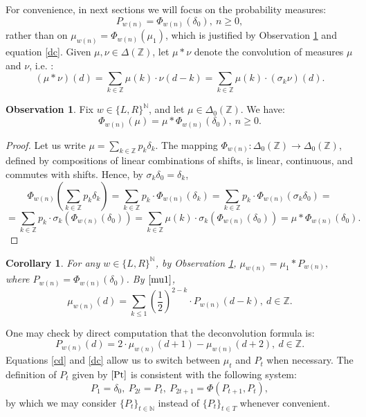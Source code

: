 \documentclass[10pt]{amsart}
\newtheorem{corollary}[theorem]{Corollary}
\theoremstyle{definition}
\newtheorem{observation}[theorem]{Observation}
\numberwithin{equation}{section}
\newcommand{\dd}{\delta}
\newcommand{\N}{\mathbb{N}}
\newcommand{\Z}{\mathbb{Z}}
\begin{document}
For convenience, in next sections we will focus on the probability measures:
\begin{equation}\label{Pt}
P_{w(n)} = \Phi_{w(n)}(\delta_0),\ n\geq 0, 
\end{equation} 
rather than on $\mu_{w(n)}= \Phi_{w(n)}(\mu_1)$, which is justified by Observation \ref{O2} and equation \eqref{dc}. %
 Given $\mu,\nu\in\Delta(\Z)$, let $\mu\ast\nu$ denote the convolution of measures $\mu$ and $\nu$, i.e. :
$$(\mu\ast\nu)(d)=\sum\limits_{k\in\Z}\mu(k)\cdot\nu(d-k)=\sum\limits_{k\in\Z}\mu(k)\cdot (\sigma_{k}\nu)(d).$$
\begin{observation}\label{O2}
Fix $w\in\{L,R\}^\N$, and let $\mu\in \Delta_0(\Z)$. We have:
  \begin{equation}\Phi_{w(n)}(\mu)=\mu\ast \Phi_{w(n)}(\delta_0),\ n\geq0.
\end{equation}
\end{observation}
\begin{proof}
 Let us write $\mu=\sum\limits_{k\in\Z}p_k\delta_k$. The mapping $\Phi_{w(n)}\colon\Delta_0(\Z)\to\Delta_0(\Z)$, defined by compositions of linear combinations of shifts,  is linear, continuous, and commutes with shifts. Hence, by $\sigma_{k}\dd_0=\dd_k$,
$$\Phi_{w(n)}\left(\sum\limits_{k\in\Z}p_k\delta_k\right)=\sum\limits_{k\in\Z}p_k\cdot\Phi_{w(n)}(\delta_k)=\sum\limits_{k\in\Z}p_k\cdot\Phi_{w(n)}(\sigma_{k}\dd_0)=$$
$$=\sum\limits_{k\in\Z}p_k\cdot \sigma_{k}(\Phi_{w(n)}(\dd_0))=\sum\limits_{k\in\Z}\mu(k)\cdot \sigma_{k}(\Phi_{w(n)}(\dd_0))=\mu\ast\Phi_{w(n)}(\dd_0).$$
\end{proof}




\begin{corollary}\label{RR}
For any $w\in\{L,R\}^\N$,  by Observation \ref{O2}, $\mu_{w(n)}=\mu_1\ast P_{w(n)},$
where $P_{w(n)}=\Phi_{w(n)}(\dd_0)$. By $\eqref{mu1}$,
\begin{equation}\label{cd}
\mu_{w(n)}(d)=\sum\limits_{k\leq 1} \left(\frac12\right)^{2-k}\cdot P_{w(n)}(d-k),\ d\in\Z.
\end{equation}
\end{corollary}
 One may check by direct computation that the deconvolution formula is:
\begin{equation}\label{dc}
P_{w(n)}(d)= 2\cdot\mu_{w(n)}(d+1)-\mu_{w(n)}(d+2),\ d\in\Z.
\end{equation}
Equations \eqref{cd} and \eqref{dc} allow us to switch between $\mu_t$ and $P_t$ when necessary. The definition of $P_t$ given by $\eqref{Pt}$ is consistent with the following system:
\begin{equation}\label{system}
P_1=\dd_0,\ P_{2t}=P_t,\ P_{2t+1}=\Phi(P_{t+1},P_t),
\end{equation}
by which we may consider $\{P_t\}_{t\in\N}$ instead of $\{P_t\}_{t\in T}$ whenever convenient.
\end{document}
